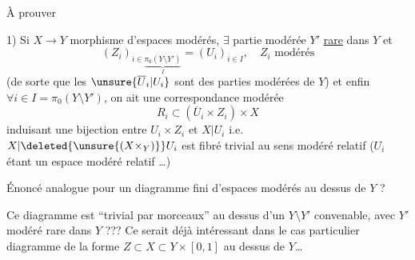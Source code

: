 
À prouver

1) Si $X\to Y$ morphisme d'espaces modérés, $\exists$ partie modérée $Y'$ \uline{rare} dans $Y$ et
\[
(Z_i)_{i\in\underbrace{\pi_0(Y\setminus Y')}_{I}}=(U_i)_{i\in I},\quad Z_i\text{ modérés}
\]
(de sorte que les $\unsure{\overline U_i|U_i}$ sont des parties modérées de $Y$) et enfin $\forall i\in I=\pi_0(Y\setminus Y')$, on ait une correspondance modérée
\[
R_i\subset(\overline U_i\times Z_i)\times X
\]
induisant une bijection entre $U_i\times Z_i$ et $X|U_i$ i.e. $X|\deleted{\unsure{(X\times_Y)}}U_i$ est fibré  trivial au sens modéré relatif ($U_i$ étant un espace modéré relatif \ldots)

Énoncé analogue pour un diagramme fini d'espaces modérés au dessus de $Y$ ?

Ce diagramme est  ``trivial par morceaux'' au dessus d'un $Y\setminus Y'$ convenable, avec $Y'$ modéré rare dans $Y$ ??? Ce serait déjà intéressant dans le cas particulier  diagramme de la forme $Z\subset X\subset Y\times[0,1]$ \deleted{$\unsure{I\subset[0,}$} au dessus de $Y$\ldots


